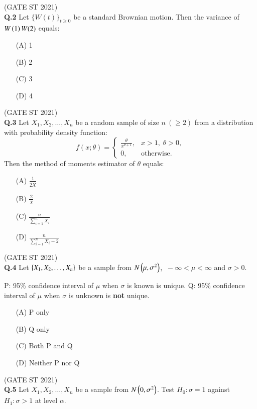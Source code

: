 \documentclass[journal,12pt,onecolumn]{IEEEtran}
\theoremstyle{remark}
\begin{document}
\hfill (GATE ST 2021) \\


\textbf{Q.2}
Let $\{W(t)\}_{t \geq 0}$ be a standard Brownian motion.  
Then the variance of $W\left(1\right) W(2)$ equals:
\begin{enumerate}
\item[(A)] 1
\item[(B)] 2
\item[(C)] 3
\item[(D)] 4
\end{enumerate}

\hfill (GATE ST 2021) \\

\textbf{Q.3}
Let $X_1, X_2, \dots, X_n$ be a random sample of size $n \ (\geq 2)$ from a distribution with probability density function:
\[
f(x; \theta) =
\begin{cases}
\frac{\theta}{x^{\theta+1}}, & x > 1, \; \theta > 0, \\
0, & \text{otherwise}.
\end{cases}
\]
Then the method of moments estimator of $\theta$ equals:
\begin{enumerate}
\item[(A)] $\frac{1}{2\bar{X}}$
\item[(B)] $\frac{2}{\bar{X}}$
\item[(C)] $\frac{n}{\sum_{i=1}^n X_i}$
\item[(D)] $\frac{n}{\sum_{i=1}^n X_i - 2}$
\end{enumerate}

\hfill (GATE ST 2021) \\

\textbf{Q.4}
Let $\left\{ X_1, X_2, \dots, X_n \right\}$ be a sample from $N\left(\mu,\sigma^2\right)$, $\ -\infty < \mu < \infty$ and $\sigma > 0$.

P: 95\% confidence interval of $\mu$ when $\sigma$ is known is unique.  
Q: 95\% confidence interval of $\mu$ when $\sigma$ is unknown is \textbf{not} unique.

\begin{enumerate}
\item[(A)] P only
\item[(B)] Q only
\item[(C)] Both P and Q
\item[(D)] Neither P nor Q
\end{enumerate}
\hfill (GATE ST 2021) \\


\textbf{Q.5}
Let $X_1, X_2, \dots, X_n$ be a sample from $N\left(0,\sigma^2\right)$.  
Test $H_0: \sigma = 1$ against $H_1: \sigma > 1$ at level $\alpha$.
\end{document}
